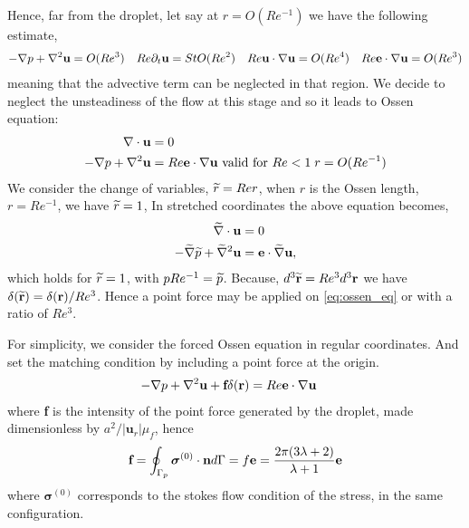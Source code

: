 Hence, far from the droplet, let say at $r = O(Re^{-1})$ we have the following estimate, 
\begin{align}
    -\grad p + \grad^2 \textbf{u} = O(Re^3) &&
    Re \pddt \textbf{u} = St O(Re^2) && 
    Re \textbf{u}\cdot \grad \textbf{u} = O(Re^4) && 
    Re \textbf{e}\cdot \grad \textbf{u} = O(Re^3) 
\end{align}
meaning that the advective term can be neglected in that region. 
We decide to neglect the unsteadiness of the flow at this stage and so it leads to Ossen equation: 
\begin{align}
    \div \textbf{u} &= 0
    \\
    -\grad p + \grad^2 \textbf{u}
    &= 
    Re  \textbf{e} \cdot \grad \textbf{u} 
    \text{  valid for } Re < 1\;  r = O(Re^{-1})
    \label{eq:ossen_eq}
\end{align}
We consider the change of variables, $\wt{r} = Re r$, when $r$ is the Ossen length, $r=Re^{-1}$, we have $\wt{r} = 1$,
In stretched coordinates the above equation becomes, 
\begin{align}
     \wt{\grad}\cdot  \textbf{u} &= 0
    \\
    - 
    \wt{\grad} \wt{p} +  \wt{\grad}^2 \textbf{u}
    &= 
    \textbf{e} \cdot \wt{\grad} \textbf{u}, 
    \label{eq:ossen_eq_streatching}
\end{align}
which holds for $\wt{r} = 1$, with $p Re^{-1}= \wt{p}$. 
Because, $d^3\wt{\textbf{r}}= Re^3 d^3 \textbf{r}$ we have $ \delta(\wt{\textbf{r}}) = \delta(\textbf{r})/Re^3$. Hence a point force may be applied on \ref{eq:ossen_eq} or \label{eq:ossen_eq_streatching} with a ratio of $Re^3$. 

For simplicity, we consider the forced Ossen equation in regular coordinates. And set the matching condition by including a point force at the origin. 
\begin{align}
    -\grad p + \grad^2 \textbf{u}
    + \textbf{f}\delta(\textbf{r})
    &= 
    Re  \textbf{e} \cdot \grad \textbf{u} 
\end{align}
where \textbf{f} is the intensity of the point force generated by the droplet, made dimensionless by $a^2 / |\textbf{u}_r| \mu_f$, hence 
\begin{equation}
    \textbf{f}= \intS[p]{\bm\sigma^{(0)}\cdot \textbf{n}}=f \textbf{e} = \frac{2\pi(3\lambda+2)}{\lambda+1}\textbf{e}
\end{equation}
where $\bm\sigma^{(0)}$ corresponds to the stokes flow condition of the stress, in the same configuration. 

